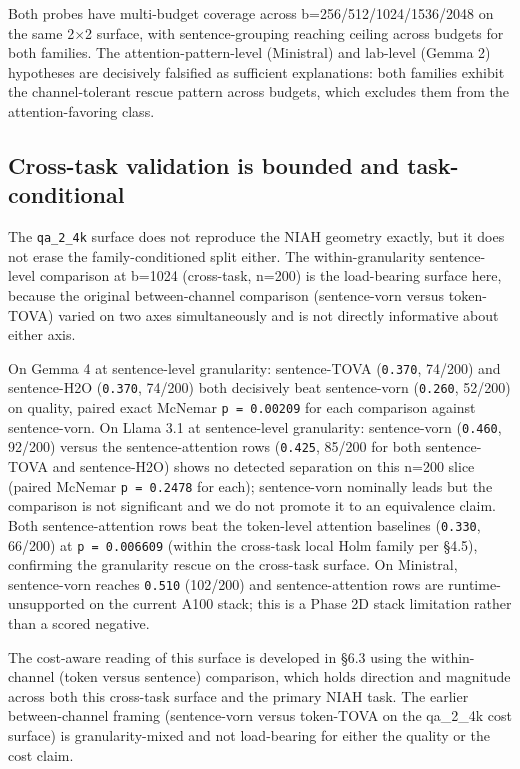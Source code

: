 \documentclass[10pt]{article}
\begin{document}
Both probes have multi-budget coverage across b=256/512/1024/1536/2048
on the same 2$\times$2 surface, with sentence-grouping reaching ceiling
across budgets for both families. The attention-pattern-level
(Ministral) and lab-level (Gemma 2) hypotheses are decisively
falsified as sufficient explanations: both families exhibit the
channel-tolerant rescue pattern across budgets, which excludes them
from the attention-favoring class.

\subsection{Cross-task validation is bounded and task-conditional}\label{57-cross-task-validation-is-bounded-and-task-conditional}

The \texttt{qa\_2\_4k} surface does not reproduce the NIAH geometry
exactly, but it does not erase the family-conditioned split either. The
within-granularity sentence-level comparison at b=1024 (cross-task, n=200)
is the load-bearing surface here, because the original between-channel
comparison (sentence-vorn versus token-TOVA) varied on two axes
simultaneously and is not directly informative about either axis.

On Gemma 4 at sentence-level granularity: sentence-TOVA
(\texttt{0.370}, 74/200) and sentence-H2O (\texttt{0.370}, 74/200)
both decisively beat sentence-vorn (\texttt{0.260}, 52/200) on quality,
paired exact McNemar \texttt{p\ =\ 0.00209} for each comparison against
sentence-vorn. On Llama 3.1 at sentence-level granularity: sentence-vorn
(\texttt{0.460}, 92/200) versus the sentence-attention rows
(\texttt{0.425}, 85/200 for both sentence-TOVA and
sentence-H2O) shows no detected separation on this n=200 slice
(paired McNemar \texttt{p\ =\ 0.2478} for each); sentence-vorn nominally
leads but the comparison is not significant and we do not promote it to
an equivalence claim. Both sentence-attention rows beat the token-level
attention baselines (\texttt{0.330}, 66/200) at \texttt{p\ =\ 0.006609}
(within the cross-task local Holm family per \S{}4.5), confirming the
granularity rescue on the cross-task surface. On Ministral,
sentence-vorn reaches \texttt{0.510} (102/200) and sentence-attention
rows are runtime-unsupported on the current A100 stack; this is a Phase
2D stack limitation rather than a scored negative.

The cost-aware reading of this surface is developed in \S{}6.3 using the
within-channel (token versus sentence) comparison, which holds direction
and magnitude across both this cross-task surface and the primary NIAH
task. The earlier between-channel framing (sentence-vorn versus
token-TOVA on the qa\_2\_4k cost surface) is granularity-mixed and
not load-bearing for either the quality or the cost claim.
\end{document}
